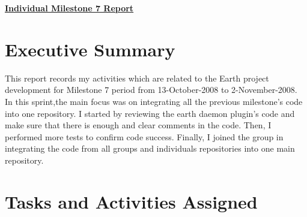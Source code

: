 \documentclass{article}
\begin{document}
\pagestyle{headings}

\begin{center}
{\LARGE\textbf{\underline{{Individual Milestone 7 Report}}}}
\end{center}

\section*{Executive Summary}
This report records my activities which are related to the Earth project development for Milestone 7 period from 13-October-2008 to 2-November-2008.\\
In this sprint,the main focus was on integrating all the previous milestone's code into one repository. I started by reviewing the earth daemon plugin's code and make sure that there is enough and clear comments in the code. Then, I performed more tests to confirm code success. Finally, I joined the group in integrating the code from all groups and individuals repositories into one main repository.    

\section*{Tasks and Activities Assigned}
\end{document}
